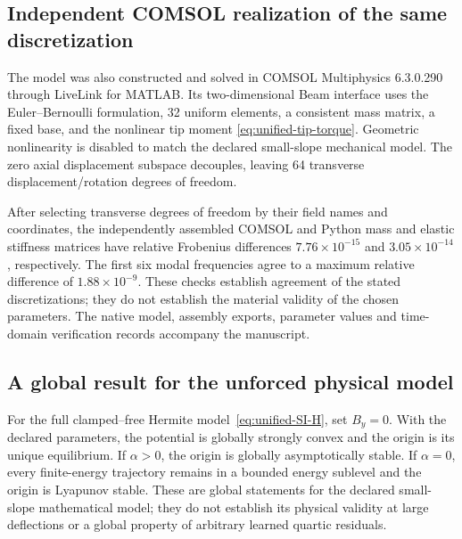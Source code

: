 \subsection{Independent COMSOL realization of the same discretization}
The model was also constructed and solved in COMSOL Multiphysics
6.3.0.290 through LiveLink for MATLAB. Its two-dimensional Beam interface
uses the Euler--Bernoulli formulation, 32 uniform elements, a consistent
mass matrix, a fixed base, and the nonlinear tip moment
\eqref{eq:unified-tip-torque}. Geometric nonlinearity is disabled to match
the declared small-slope mechanical model. The zero axial displacement
subspace decouples, leaving 64 transverse displacement/rotation degrees
of freedom.

After selecting transverse degrees of freedom by their field names and
coordinates, the independently assembled COMSOL and Python mass and
elastic stiffness matrices have relative Frobenius differences
$7.76\times10^{-15}$ and $3.05\times10^{-14}$, respectively. The first
six modal frequencies agree to a maximum relative difference of
$1.88\times10^{-9}$. These checks establish agreement of the stated
discretizations; they do not establish the material validity of the
chosen parameters. The native model, assembly exports, parameter values
and time-domain verification records accompany the manuscript.

\subsection{A global result for the unforced physical model}
\begin{proposition}
\label{prop:unified-global-stability}
For the full clamped--free Hermite model~\eqref{eq:unified-SI-H}, set
$B_y=0$. With the declared parameters, the potential is globally
strongly convex and the origin is its unique equilibrium.
If $\alpha>0$, the origin is globally asymptotically stable.
If $\alpha=0$, every finite-energy trajectory remains in a bounded
energy sublevel and the origin is Lyapunov stable.
These are global statements for the declared small-slope mathematical
model; they do not establish its physical validity at large deflections
or a global property of arbitrary learned quartic residuals.
\end{proposition}

